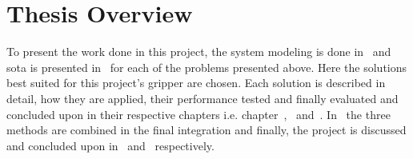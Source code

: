 

\section{Thesis Overview}\label{sec:intro-thesis-overview}

To present the work done in this project, the system modeling is done in~ and \gls{sota} is presented in~ for each of the problems presented above. Here the solutions best suited for this project's gripper are chosen. Each solution is described in detail, how they are applied, their performance tested and finally evaluated and concluded upon in their respective chapters i.e. chapter~,~ and~. In~ the three methods are combined in the final integration and finally, the project is discussed and concluded upon in~ and~ respectively.


